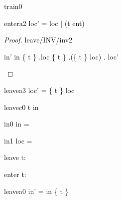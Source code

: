 \documentclass[12pt]{amsart}
\begin{document}
\begin{machine}{train0}
\begin{evassignment}{enter}{a2}
	loc' = loc | (t \tfun ent)
\end{evassignment}

\begin{proof}{leave/INV/inv2}
	\begin{calculation}
		in'
	\hint{=}{ \ref{a0} }
		in \setminus \{ t \}
	\hint{=}{ \ref{inv2} }
		\dom.loc \setminus \{ t \}
		\dom.(\{ t \} \domsub loc)
	\hint{=}{ \ref{a3} } 
		\dom. loc' 
	\end{calculation}
\end{proof}

\begin{evassignment}{leave}{a3}
	loc' = \{ t \} \domsub loc 
\end{evassignment}

\begin{cschedule}{leave}{c0}
	t \in in
\end{cschedule}

\begin{initialization}{in0}
	in = \emptyset
\end{initialization}
\begin{initialization}{in1}
	loc = \emptyfun
\end{initialization}

\begin{use:set}{\TRAIN} \end{use:set}
\begin{use:set}{\LOC} \end{use:set}
\begin{use:set}{\BLK} \end{use:set}
\begin{use:fun}{\TRAIN}{\BLK} \end{use:fun}

\begin{indices}{leave}
	t: \TRAIN
\end{indices}

\begin{indices}{enter}
	t: \TRAIN
\end{indices}

\begin{evassignment}{leave}{a0}
	in' = in \setminus \{ t \}
\end{evassignment}


\end{machine}
\end{document}
